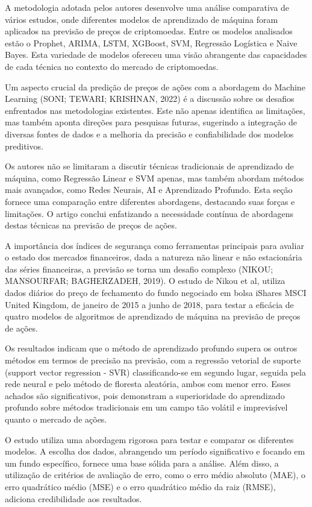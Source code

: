\documentclass[
]{article}
\begin{document}
A metodologia adotada pelos autores desenvolve uma análise comparativa
de vários estudos, onde diferentes modelos de aprendizado de máquina
foram aplicados na previsão de preços de criptomoedas. Entre os modelos
analisados estão o Prophet, ARIMA, LSTM, XGBoost, SVM, Regressão
Logística e Naive Bayes. Esta variedade de modelos ofereceu uma visão
abrangente das capacidades de cada técnica no contexto do mercado de
criptomoedas.

Um aspecto crucial da predição de preços de ações com a abordagem do
Machine Learning (SONI; TEWARI; KRISHNAN, 2022) é a discussão sobre os
desafios enfrentados nas metodologias existentes. Este não apenas
identifica as limitações, mas também aponta direções para pesquisas
futuras, sugerindo a integração de diversas fontes de dados e a melhoria
da precisão e confiabilidade dos modelos preditivos.

Os autores não se limitaram a discutir técnicas tradicionais de
aprendizado de máquina, como Regressão Linear e SVM apenas, mas também
abordam métodos mais avançados, como Redes Neurais, AI e Aprendizado
Profundo. Esta seção fornece uma comparação entre diferentes abordagens,
destacando suas forças e limitações. O artigo conclui enfatizando a
necessidade contínua de abordagens destas técnicas na previsão de preços
de ações.

A importância dos índices de segurança como ferramentas principais para
avaliar o estado dos mercados financeiros, dada a natureza não linear e
não estacionária das séries financeiras, a previsão se torna um desafio
complexo (NIKOU; MANSOURFAR; BAGHERZADEH, 2019). O estudo de Nikou et
al, utiliza dados diários do preço de fechamento do fundo negociado em
bolsa iShares MSCI United Kingdom, de janeiro de 2015 a junho de 2018,
para testar a eficácia de quatro modelos de algoritmos de aprendizado de
máquina na previsão de preços de ações.

Os resultados indicam que o método de aprendizado profundo supera os
outros métodos em termos de precisão na previsão, com a regressão
vetorial de suporte (support vector regression - SVR) classificando-se
em segundo lugar, seguida pela rede neural e pelo método de floresta
aleatória, ambos com menor erro. Esses achados são significativos, pois
demonstram a superioridade do aprendizado profundo sobre métodos
tradicionais em um campo tão volátil e imprevisível quanto o mercado de
ações.

O estudo utiliza uma abordagem rigorosa para testar e comparar os
diferentes modelos. A escolha dos dados, abrangendo um período
significativo e focando em um fundo específico, fornece uma base sólida
para a análise. Além disso, a utilização de critérios de avaliação de
erro, como o erro médio absoluto (MAE), o erro quadrático médio (MSE) e
o erro quadrático médio da raiz (RMSE), adiciona credibilidade aos
resultados.
\end{document}
